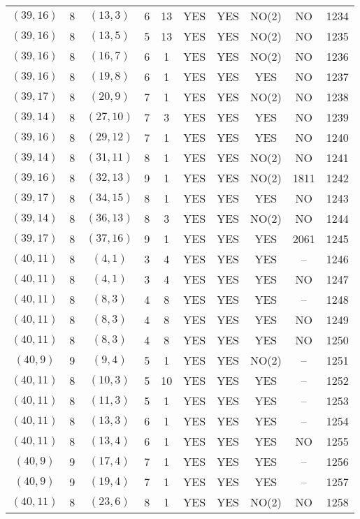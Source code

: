 \begin{longtable}{|c|c|c|c|c|c|c|c|c|c|}
$(39, 16)$ & 8 & $(13, 3)$ & 6 & 13 & YES & YES & NO(2) & NO & 1234\\
$(39, 16)$ & 8 & $(13, 5)$ & 5 & 13 & YES & YES & NO(2) & NO & 1235\\
$(39, 16)$ & 8 & $(16, 7)$ & 6 & 1 & YES & YES & NO(2) & NO & 1236\\
$(39, 16)$ & 8 & $(19, 8)$ & 6 & 1 & YES & YES & YES & NO & 1237\\
$(39, 17)$ & 8 & $(20, 9)$ & 7 & 1 & YES & YES & NO(2) & NO & 1238\\
$(39, 14)$ & 8 & $(27, 10)$ & 7 & 3 & YES & YES & YES & NO & 1239\\
$(39, 16)$ & 8 & $(29, 12)$ & 7 & 1 & YES & YES & YES & NO & 1240\\
$(39, 14)$ & 8 & $(31, 11)$ & 8 & 1 & YES & YES & NO(2) & NO & 1241\\
$(39, 16)$ & 8 & $(32, 13)$ & 9 & 1 & YES & YES & NO(2) & 1811 & 1242\\
$(39, 17)$ & 8 & $(34, 15)$ & 8 & 1 & YES & YES & YES & NO & 1243\\
$(39, 14)$ & 8 & $(36, 13)$ & 8 & 3 & YES & YES & NO(2) & NO & 1244\\
$(39, 17)$ & 8 & $(37, 16)$ & 9 & 1 & YES & YES & YES & 2061 & 1245\\
$(40, 11)$ & 8 & $(4, 1)$ & 3 & 4 & YES & YES & YES & -- & 1246\\
$(40, 11)$ & 8 & $(4, 1)$ & 3 & 4 & YES & YES & YES & NO & 1247\\
$(40, 11)$ & 8 & $(8, 3)$ & 4 & 8 & YES & YES & YES & -- & 1248\\
$(40, 11)$ & 8 & $(8, 3)$ & 4 & 8 & YES & YES & YES & NO & 1249\\
$(40, 11)$ & 8 & $(8, 3)$ & 4 & 8 & YES & YES & YES & NO & 1250\\
$(40, 9)$ & 9 & $(9, 4)$ & 5 & 1 & YES & YES & NO(2) & -- & 1251\\
$(40, 11)$ & 8 & $(10, 3)$ & 5 & 10 & YES & YES & YES & -- & 1252\\
$(40, 11)$ & 8 & $(11, 3)$ & 5 & 1 & YES & YES & YES & -- & 1253\\
$(40, 11)$ & 8 & $(13, 3)$ & 6 & 1 & YES & YES & YES & -- & 1254\\
$(40, 11)$ & 8 & $(13, 4)$ & 6 & 1 & YES & YES & YES & NO & 1255\\
$(40, 9)$ & 9 & $(17, 4)$ & 7 & 1 & YES & YES & YES & -- & 1256\\
$(40, 9)$ & 9 & $(19, 4)$ & 7 & 1 & YES & YES & YES & -- & 1257\\
$(40, 11)$ & 8 & $(23, 6)$ & 8 & 1 & YES & YES & NO(2) & NO & 1258\\

\end{longtable}
